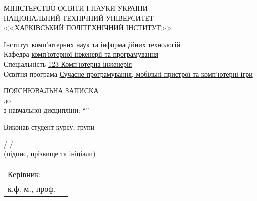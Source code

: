 \makeatletter
\begin{titlepage}
    \begin{center}
        МІНІСТЕРСТВО ОСВІТИ І НАУКИ УКРАЇНИ\\
        НАЦІОНАЛЬНИЙ ТЕХНІЧНИЙ УНІВЕРСИТЕТ\\
        <<ХАРКІВСЬКИЙ ПОЛІТЕХНІЧНИЙ ІНСТИТУТ>>\\
        \vspace*{\baselineskip}
        \raggedright
        Інститут \underline{комп'ютерних наук та інформаційних технологій}\\
        Кафедра \underline{комп’ютерної інженерії та програмування}\\
        Спеціальність \underline{123 Комп’ютерна інженерія}\\
        Освітня програма \small {} \underline{Сучасне програмування, мобільні пристрої та комп'ютерні ігри}

        \vspace*{3\baselineskip}
        \normalsize
        \centering
        \onehalfspacing

        ПОЯСНЮВАЛЬНА ЗАПИСКА\\
        до \@title\\
        з навчальної дисципліни: ``\Subject''\\

        \vspace*{3\baselineskip}
        \raggedleft

        \begin{minipage}{0.58\textwidth}
            \raggedleft
            Виконав студент \CourseYear курсу, групи \StudGroup\\
            \vspace{0.3\baselineskip}

            \underline{\hspace{2cm}} / \@author/\\
            {\scriptsize (підпис, прізвище та ініціали)}
            
            \vspace*{\baselineskip}

            \begin{minipage}{0.58\textwidth}
                \begin{tabular}{@{}ll}
                 Керівник: & \\
                 к.ф.-м., проф. &\\
                \end{tabular}
            \end{minipage}
            \vspace{0.3\baselineskip}
            

\end{minipage}
\end{center}
\end{titlepage}
